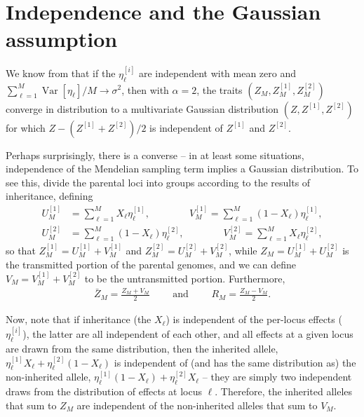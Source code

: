 \documentclass{article}
\newcommand{\var}{\mathop{\mbox{Var}}}
\newcommand{\1}{\mathbbm{1}}
\theoremstyle{remark}
\theoremstyle{definition}
\begin{document}
\section{Independence and the Gaussian assumption}

We know from \citet{barton2017infinitesimal}  
that if the $\eta^{[i]}_\ell$ are
independent with mean zero and $\sum_{\ell=1}^M \var[\eta_\ell]/M \to \sigma^2$,
then with $\alpha=2$,
the traits $(Z_M, Z_M^{[1]}, Z_M^{[2]})$ converge in distribution to a multivariate Gaussian distribution
$(Z, Z^{[1]}, Z^{[2]})$ for which $Z - (Z^{[1]} + Z^{[2]})/2$ is independent of $Z^{[1]}$ and $Z^{[2]}$.

Perhaps surprisingly, there is a converse --
in at least some situations,
independence of the Mendelian sampling term implies a Gaussian distribution.
To see this,
divide the parental loci into groups according to the results of inheritance,
defining
\begin{align*}
    U_M^{[1]} &= \sum_{\ell=1}^M X_\ell \eta_\ell^{[1]}  ,
    \qquad \qquad
    V_M^{[1]} = \sum_{\ell=1}^M (1-X_\ell) \eta_\ell^{[1]} ,  \\
    U_M^{[2]} &= \sum_{\ell=1}^M (1-X_\ell) \eta_\ell^{[2]} ,
    \qquad \qquad
    V_M^{[2]} = \sum_{\ell=1}^M X_\ell \eta_\ell^{[2]}  ,
\end{align*}
so that 
$Z_M^{[1]} = U_M^{[1]} + V_M^{[1]}$ and
$Z_M^{[2]} = U_M^{[2]} + V_M^{[2]}$, while
$Z_M = U_M^{[1]} + U_M^{[2]}$ is the transmitted portion of the parental genomes,
and we can define $V_M = V_M^{[1]} + V_M^{[2]}$ to be the untransmitted portion.
Furthermore,
\begin{align*}
    \bar Z_M = \frac{Z_M + V_M}{2}
    \qquad \text{ and } \qquad
    R_M = \frac{Z_M - V_M}{ 2 } .
\end{align*}

Now, note that if inheritance (the $X_\ell$) is independent of the per-locus effects ($\eta_\ell^{[i]}$),
the latter are all independent of each other,
and all effects at a given locus are drawn from the same distribution,
then the inherited allele, 
$\eta_\ell^{[1]} X_\ell + \eta_\ell^{[2]} (1-X_\ell)$
is independent of (and has the same distribution as)
the non-inherited allele,
$\eta_\ell^{[1]} (1-X_\ell) + \eta_\ell^{[2]} X_\ell$
-- they are simply two independent draws from the distribution of effects at locus $\ell$.
Therefore, the inherited alleles that sum to $Z_M$
are independent of the non-inherited alleles that sum to $V_M$.
\end{document}
